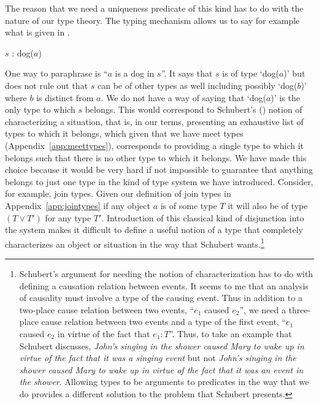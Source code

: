 The reason that we need a uniqueness predicate of this kind has to do
with the nature of our type theory.  The typing mechanism allows us to
say for example what is given in \nexteg{}.
\begin{ex} 
$s$ : dog($a$) 
\end{ex} 
One way to paraphrase \preveg{} is ``$a$ is a dog in $s$''.  It says
that $s$ is of type `dog($a$)' but does not rule out that $s$ can be
of other types as well including possibly `dog($b$)' where $b$ is
distinct from $a$.  We do not have a way of saying that `dog($a$)' is
the only type to which $s$ belongs. This would correspond to
Schubert's (\citeyear{Schubert2000})\label{pg:Schubert-characterize} notion of characterizing a
situation, that is, in our terms, presenting an exhaustive list of
types to which it belongs, which given that we have meet types (Appendix~\ref{app:meettypes}),
corresponds to providing a single type to which it belongs such that there is no
other type to which it belongs.  We have made this choice because it would be very hard if
not impossible to guarantee that anything belongs to just one type in
the kind of type system we have introduced.  Consider, for example,
join types. Given our definition of join types in
Appendix~\ref{app:jointypes} if any object $a$ is of some type $T$ it
will also be of type $(T\vee T')$ for any type $T'$.  Introduction
of this classical kind of disjunction into the system makes it
difficult to define a useful notion of a type that completely
characterizes an object or situation in the way that Schubert
wants.\footnote{Schubert's argument for needing the notion of
  characterization has to do with defining a causation relation
  between events.  It seems to me that an analysis of causality must
  involve a type of the causing event.  Thus in addition to a
  two-place cause relation between two events, ``$e_1$ caused
  $e_2$'', we need a three-place cause relation between two events and
  a type of the first event, ``$e_1$ caused $e_2$ in virtue of the fact that
  $e_1:T$''. Thus, to take an example that Schubert discusses,
  \textit{John's singing in the shower caused Mary to wake up in
    virtue of the fact that it was a singing event} but not \textit{John's singing in the shower caused Mary to wake up in
    virtue of the fact that it was an event in the shower}.  Allowing
  types to be arguments to predicates in the way that we do provides a
different solution to the problem that Schubert presents.} 


